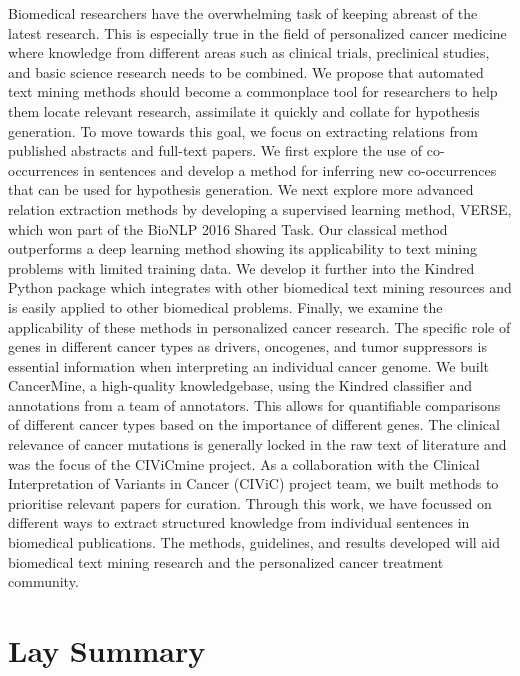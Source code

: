 Biomedical researchers have the overwhelming task of keeping abreast of the latest research. This is especially true in the field of personalized cancer medicine where knowledge from different areas such as clinical trials, preclinical studies, and basic science research needs to be combined. We propose that automated text mining methods should become a commonplace tool for researchers to help them locate relevant research, assimilate it quickly and collate for hypothesis generation. To move towards this goal, we focus on extracting relations from published abstracts and full-text papers. We first explore the use of co-occurrences in sentences and develop a method for inferring new co-occurrences that can be used for hypothesis generation. We next explore more advanced relation extraction methods by developing a supervised learning method, VERSE, which won part of the BioNLP 2016 Shared Task. Our classical method outperforms a deep learning method showing its applicability to text mining problems with limited training data. We develop it further into the Kindred Python package which integrates with other biomedical text mining resources and is easily applied to other biomedical problems. Finally, we examine the applicability of these methods in personalized cancer research. The specific role of genes in different cancer types as drivers, oncogenes, and tumor suppressors is essential information when interpreting an individual cancer genome. We built CancerMine, a high-quality knowledgebase, using the Kindred classifier and annotations from a team of annotators. This allows for quantifiable comparisons of different cancer types based on the importance of different genes. The clinical relevance of cancer mutations is generally locked in the raw text of literature and was the focus of the CIViCmine project. As a collaboration with the Clinical Interpretation of Variants in Cancer (CIViC) project team, we built methods to prioritise relevant papers for curation. Through this work, we have focussed on different ways to extract structured knowledge from individual sentences in biomedical publications. The methods, guidelines, and results developed will aid biomedical text mining research and the personalized cancer treatment community.

\chapter{Lay Summary}

